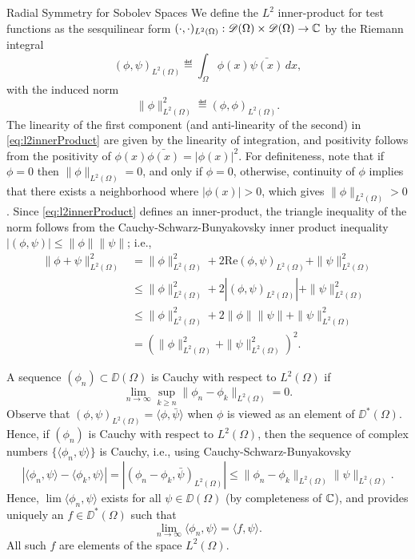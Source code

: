 \begin{chapter}{Radial Symmetry for Sobolev Spaces}
We define the $L^2$ inner-product for test functions as the sesquilinear form $(\cdot,\cdot)_{L^2(\Omega)}:\mathscr D(\Omega)\times\mathscr D(\Omega) \to \mathbb C$ by the Riemann integral
\begin{equation} \label{eq:l2innerProduct}
  (\phi,\psi)_{L^2(\Omega)} \eqdef \int_{\Omega} \phi(x)\bar{\psi(x)}\,dx,
\end{equation}
with the induced norm 
\begin{equation} \label{eq:l2norm}
  \|\phi\|^2_{L^2(\Omega)} \eqdef (\phi,\phi)_{L^2(\Omega)}.
\end{equation}
The linearity of the first component (and anti-linearity of the second) in \eqref{eq:l2innerProduct} are given by the linearity of integration, and positivity follows from the positivity of $\phi(x)\bar{\phi(x)} = |\phi(x)|^2$. 
For definiteness, note that if $\phi = 0$ then $\|\phi\|_{L^2(\Omega)} = 0$, and only if $\phi = 0$, otherwise, continuity of $\phi$ implies that there exists a neighborhood where $|\phi(x)| > 0$, which gives $\|\phi\|_{L^2(\Omega)} > 0$.
Since \eqref{eq:l2innerProduct} defines an inner-product, the triangle inequality of the norm follows from the Cauchy-Schwarz-Bunyakovsky inner product inequality $|(\phi,\psi)|\le \|\phi\|\|\psi\|$; i.e.,
\begin{align}
  \|\phi + \psi\|_{L^2(\Omega)}^2 
    &= \|\phi\|_{L^2(\Omega)}^2 + 2\mathrm{Re} (\phi,\psi)_{L^2(\Omega)}  + \|\psi\|_{L^2(\Omega)}^2 \nonumber\\
    &\le \|\phi\|_{L^2(\Omega)}^2 + 2|(\phi,\psi)_{L^2(\Omega)}|  + \|\psi\|_{L^2(\Omega)}^2 \nonumber\\
    &\le \|\phi\|_{L^2(\Omega)}^2 + 2\|\phi\|\|\psi\|  + \|\psi\|_{L^2(\Omega)}^2 \nonumber \\
    &= (\|\phi\|_{L^2(\Omega)}^2 + \|\psi\|_{L^2(\Omega)}^2)^2.
\end{align}

A sequence $(\phi_n)\subset \DD(\Omega)$ is Cauchy with respect to $L^2(\Omega)$ if
\begin{equation} 
  \lim_{n\to\infty}\sup_{k\ge n} \|\phi_n - \phi_k\|_{L^2(\Omega)} = 0.
\end{equation}
Observe that $(\phi,\psi)_{L^2(\Omega)} = \langle \phi,\bar{\psi}\rangle$ when $\phi$ is viewed as an element of $\DD^*(\Omega)$.
Hence, if $(\phi_n)$ is Cauchy with respect to $L^2(\Omega)$, then the sequence of complex numbers $\big\{\langle \phi_n,\psi\rangle\big\}$ is Cauchy, i.e., using Cauchy-Schwarz-Bunyakovsky
\begin{equation}
  |\langle \phi_n, \psi \rangle - \langle \phi_k,\psi\rangle| 
    = |(\phi_n - \phi_k,\bar{\psi})_{L^2(\Omega)}|  
    \le \|\phi_n - \phi_k\|_{L^2(\Omega)}\|\psi\|_{L^2(\Omega)}. \label{eq:cauchySchwarz}
\end{equation}
Hence, $\lim\langle \phi_n,\psi\rangle$ exists for all $\psi \in \DD(\Omega)$ (by completeness of $\mathbb C$), and  provides uniquely an $f \in \DD^*(\Omega)$ such that
\begin{equation}
  \lim_{n\to\infty} \langle \phi_n, \psi\rangle = \langle f,\psi\rangle.
\end{equation}
All such $f$ are elements of the space $L^2(\Omega)$.


\end{chapter}
